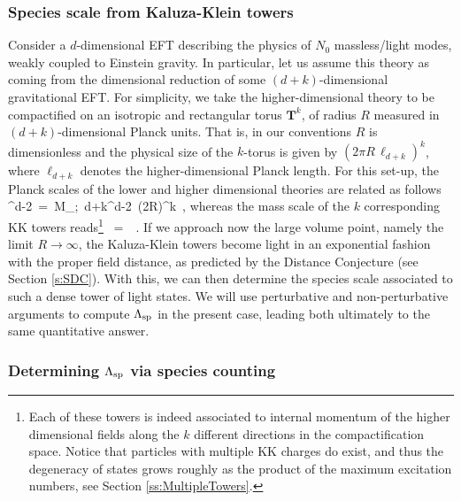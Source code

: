 \subsubsection{Species scale from Kaluza-Klein towers}\label{sss:KKtowersspecies}
	
Consider a $d$-dimensional EFT describing the physics of $N_0$ massless/light modes, weakly coupled to Einstein gravity. In particular, let us assume this theory as coming from the dimensional reduction of some $(d+k)$-dimensional gravitational EFT. For simplicity, we take the higher-dimensional theory to be compactified on an isotropic and rectangular torus $\mathbf{T}^k$, of radius $R$ measured in $(d+k)$-dimensional Planck units. That is, in our conventions $R$ is dimensionless and the physical size of the $k$-torus is given by $\left( 2\pi R\, \ell_{d+k}\right)^k$, where $\ell_{d+k}$ denotes the higher-dimensional Planck length. For this set-up, the Planck scales of the lower and higher dimensional theories are related as follows
%
\beq
	\Mpd^{d-2}\, =\, M_{;\, d+k}^{d-2}\, (2\pi R)^k\, ,
	\label{eq:Planckscales}
\eeq
%
whereas the mass scale of the $k$ corresponding  KK towers reads\footnote{Each of these towers is indeed associated to internal momentum of the higher dimensional fields along the $k$ different directions in the compactification space. Notice that particles with multiple KK charges do exist, and thus the degeneracy of states grows roughly as the product of the maximum excitation numbers, see Section \ref{ss:MultipleTowers}.}
%
\beq\label{eq:KKmass}
	\MKK\, =\, \, .
\eeq
%
If we approach now the large volume point, namely the limit $R\to \infty$, the Kaluza-Klein towers become light in an exponential fashion with the proper field distance, as predicted by the Distance Conjecture (see Section \ref{s:SDC}). With this, we can then determine the species scale associated to such a dense tower of light states. We will use perturbative and non-perturbative arguments to compute $\Lambda_{\text{sp}}$ in the present case, leading both ultimately to the same quantitative answer.

\subsubsection*{Determining $\Lambda_{\text{sp}}$ via species counting}

